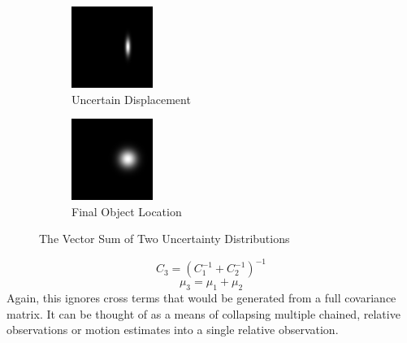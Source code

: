 \documentclass[a4paper, 11pt, titlepage]{article}
\begin{document}
\begin{description}
\begin{figure}
\begin{subfigure}{.3\textwidth}
        \centering
        \includegraphics[width=.8\linewidth]{images/GaussianSum2.png}
        \caption{Uncertain Displacement}
        \label{fig:vectSumsub2}
      \end{subfigure}
      \begin{subfigure}{.3\textwidth}
        \centering
        \includegraphics[width=.8\linewidth]{images/GaussianSum3.png}
        \caption{Final Object Location}
        \label{fig:vectSumsub3}
      \end{subfigure}
      \caption{The Vector Sum of Two Uncertainty Distributions}
      \label{fig:vectSum}
      \end{figure}
      \begin{equation}
      C_3 = (C_1^{-1} + C_2^{-1})^{-1}
      \end{equation}
      \begin{equation}
      \mu_3 = \mu_1 + \mu_2
      \end{equation}
      Again, this ignores cross terms that would be generated from a full covariance matrix.  It can be thought of as a means of collapsing multiple chained, relative observations or motion estimates into a single relative observation.


\end{description}
\end{document}
